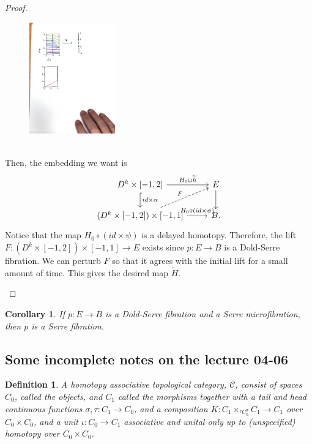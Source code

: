 \documentclass{article}
\newtheorem{corollary}[theorem]{Corollary}
\newtheorem{definition}[theorem]{Definition}
\newtheorem{proposed work}[theorem]{Proposed Work}
\theoremstyle{definition}
\begin{document}
\begin{proof}
\begin{itemize}
\begin{figure}[h]
\centering
\includegraphics[width=0.33\textwidth]{alphapic}
\end{figure}\\
Then, the embedding we want is
\begin{equation*}
\begin{tikzcd}
D^k \times [-1,2] \arrow[r, "H_0 \cup \widetilde{h}"] \arrow[d, hookrightarrow, "id \times \alpha"] & E \arrow[d] \\
(D^k \times [-1,2]) \times [-1,1] \arrow[r,"H_0 \circ(id \times \psi)"] \arrow[ur, dashed, "F"] & B.
\end{tikzcd}
\end{equation*}
Notice that the map $H_0 \circ(id \times \psi)$ is a delayed homotopy. Therefore, the lift $F: (D^k \times [-1,2]) \times [-1,1] \to E$ exists since $p: E \to B$ is a Dold-Serre fibration. We can perturb $F$ so that it agrees with the initial lift for a small amount of time. This gives the desired map $\widetilde{H}$. 
\end{itemize}
\end{proof}

\begin{corollary}
If $p: E \to B$ is a Dold-Serre fibration and a Serre microfibration, then $p$ is a Serre fibration.
\end{corollary}

\subsection{Some incomplete notes on the lecture 04-06}
\begin{definition}\label{HtpAssTopCat}
A homotopy associative topological category, $\mathcal{C}$, consist of spaces $C_0$, called the objects, and $C_1$ called the morphisms together with a tail and head continuous functions $\sigma, \tau : C_1\to C_0$, and a composition $K: C_1 \times_{{}^\tau C_0^\sigma} C_1\to C_1$ over $C_0\times C_0$, and a unit $\iota: C_0\to C_1$ associative and unital only up to (unspecified) homotopy over $C_0\times C_0$. 
\end{definition}
\end{document}
